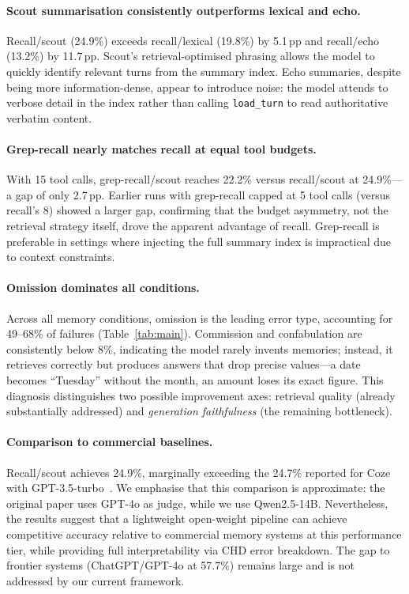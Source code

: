 \documentclass[11pt,twocolumn]{article}
\begin{document}
\paragraph{Scout summarisation consistently outperforms lexical and echo.}
Recall/scout (24.9\%) exceeds recall/lexical (19.8\%) by 5.1\,pp and
recall/echo (13.2\%) by 11.7\,pp. Scout's retrieval-optimised phrasing
allows the model to quickly identify relevant turns from the summary
index. Echo summaries, despite being more information-dense, appear to
introduce noise: the model attends to verbose detail in the index
rather than calling \texttt{load\_turn} to read authoritative verbatim
content.

\paragraph{Grep-recall nearly matches recall at equal tool budgets.}
With 15 tool calls, grep-recall/scout reaches 22.2\% versus
recall/scout at 24.9\%---a gap of only 2.7\,pp. Earlier runs with
grep-recall capped at 5 tool calls (versus recall's 8) showed a
larger gap, confirming that the budget asymmetry, not the retrieval
strategy itself, drove the apparent advantage of recall. Grep-recall
is preferable in settings where injecting the full summary index
is impractical due to context constraints.

\paragraph{Omission dominates all conditions.}
Across all memory conditions, omission is the leading error type,
accounting for 49--68\% of failures (Table~\ref{tab:main}). Commission
and confabulation are consistently below 8\%, indicating the model
rarely invents memories; instead, it retrieves correctly but produces
answers that drop precise values---a date becomes ``Tuesday'' without
the month, an amount loses its exact figure. This diagnosis
distinguishes two possible improvement axes: retrieval quality
(already substantially addressed) and \emph{generation faithfulness}
(the remaining bottleneck).

\paragraph{Comparison to commercial baselines.}
Recall/scout achieves 24.9\%, marginally exceeding the 24.7\% reported
for Coze with GPT-3.5-turbo~\cite{wu2025longmemeval}. We emphasise that
this comparison is approximate: the original paper uses GPT-4o as
judge, while we use Qwen2.5-14B. Nevertheless, the results suggest
that a lightweight open-weight pipeline can achieve competitive
accuracy relative to commercial memory systems at this performance
tier, while providing full interpretability via CHD error breakdown.
The gap to frontier systems (ChatGPT/GPT-4o at 57.7\%) remains large
and is not addressed by our current framework.
\end{document}
